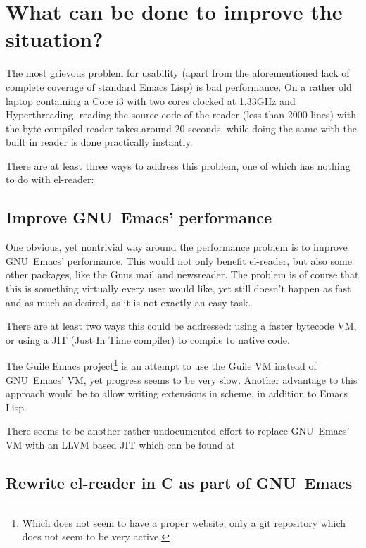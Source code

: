 \documentclass[a4paper,10pt,twoside]{report}
\newcommand{\el}{Emacs Lisp}
\newcommand{\elr}{el-reader}
\newcommand{\emacs}{GNU~Emacs}
\begin{document}
\section{What can be done to improve the situation?}
\label{sec:improve-situation}

The most grievous problem for usability (apart from the aforementioned lack of
complete coverage of standard \el{}) is bad performance.  On a rather old laptop
containing a Core i3 with two cores clocked at 1.33GHz and Hyperthreading,
reading the source code of the reader (less than 2000 lines) with the byte
compiled reader takes around 20 seconds, while doing the same with the built in
reader is done practically instantly.

There are at least three ways to address this problem, one of which has nothing
to do with \elr{}:

\subsection{Improve \emacs{}’ performance}
\label{subsec:impr-emacs-perf}

One obvious, yet nontrivial way around the performance problem is to improve
\emacs{}’ performance.  This would not only benefit \elr{}, but also some other
packages, like the Gnus mail and newsreader.\cite{gnus}  The problem is of
course that this is something virtually every user would like, yet still doesn’t
happen as fast and as much as desired, as it is not exactly an easy task.

There are at least two ways this could be addressed: using a faster bytecode VM,
or using a JIT (Just In Time compiler) to compile to native code.

The Guile Emacs project\cite{guile-emacs}\footnote{Which does not seem to have a
  proper website, only a git repository which does not seem to be very active.}
is an attempt to use the Guile\cite{guile} VM instead of \emacs{}’ VM, yet
progress seems to be very slow.  Another advantage to this approach would be to
allow writing extensions in scheme, in addition to \el{}.

There seems to be another rather undocumented effort to replace \emacs{}’ VM
with an LLVM\cite{llvm} based JIT which can be found at \cite{emacs-llvm}

\subsection{Rewrite \elr{} in C as part of \emacs{}}
\label{subsec:rewrite-in-C}
\end{document}
